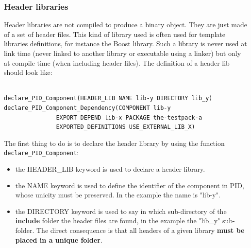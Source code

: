 \documentclass[12pt,a4paper]{article}
\begin{document}
\subsubsection{Header libraries}
\label{sec:libCMakeHeader}

Header libraries are not compiled to produce a binary object. They are just made of a set of header files. This kind of library used is often used for template libraries definitions, for instance the Boost library. Such a library is never used at link time (never linked to another library or executable using a linker) but only at compile time (when including header files). The definition of a header lib should look like:
\begin{verbatim}

declare_PID_Component(HEADER_LIB NAME lib-y DIRECTORY lib_y)
declare_PID_Component_Dependency(COMPONENT lib-y 
               EXPORT DEPEND lib-x PACKAGE the-testpack-a
               EXPORTED_DEFINITIONS USE_EXTERNAL_LIB_X)

\end{verbatim}

The first thing to do is to declare the header library by using the function \texttt{declare\_PID\_Component}:
\begin{itemize}
\item the HEADER\_LIB keyword is used to declare a header library.
\item the NAME keyword is used to define the identifier of the component in PID, whose unicity must be preserved. In the example the name is "lib-y".
\item the DIRECTORY keyword is used to say in which sub-directory of the \textbf{include} folder the header files are found, in the example the "lib\_y" sub-folder. The direct consequence is that all headers of a given library \textbf{must be placed in a unique folder}.
\end{itemize}
 
\end{document}
